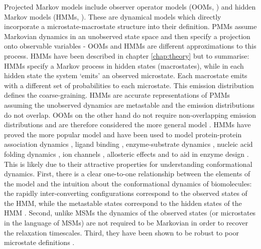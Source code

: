 Projected Markov models include observer operator models (OOMs, \cite{wuProjectedMetastableMarkov2015}) and hidden Markov models (HMMs, \cite{noeProjectedHiddenMarkov2013a}). These are dynamical models which directly incorporate a microstate-macrostate structure into their definition.  PMMs assume Markovian dynamics in an unobserved state space and then specify a projection onto observable variables - OOMs and HMMs are different approximations to this process.  HMMs have been described in chapter \ref{chap:theory} but to summarise: HMMs specify a Markov process in hidden states (macrostates), while in each hidden state the system `emits' an observed microstate.  Each macrostate emits with a different set of probabilities to each microstate. This emission distribution defines the coarse-graining.  HMMs are accurate representations of PMMs assuming the unobserved dynamics are metastable and the emission distributions do not overlap.  OOMs on the other hand do not require non-overlapping emission distributions and are therefore considered the more general model \cite{wuProjectedMetastableMarkov2015}. HMMs have proved the more popular model and have been used to model protein-protein association dynamics \cite{plattnerCompleteProteinProtein2017}, ligand binding \cite{mondalAtomicResolutionMechanism2018a, yangMappingPathwayDynamics2018, ahalawatMappingSubstrateRecognition2018, olaposiMembraneBoundTranscriptionFactor2019, hansonWhatMakesKinase2019}, enzyme-substrate dynamics \cite{panConformationalHeterogeneityMichaelis2016, wangDynamicalBehaviorVLactamases2019, curado-carballadaHiddenConformationsAspergillus2019}, nucleic acid folding dynamics \cite{FastFoldingPathwaysThrombinBinding2018, remingtonFluorescenceQuenching2aminopurinelabeled2019}, ion channels \cite{furiniIontriggeredSelectivityBacterial2018}, allosteric effects \cite{xiaoNaBindingModes2019} and to aid in enzyme design \cite{juarez-jimenezDynamicDesignManipulation2020}. This is likely due to their attractive properties for understanding conformational dynamics.  First, there is a clear one-to-one relationship between the elements of the model and the intuition about the conformational dynamics of biomolecules: the rapidly inter-converting configurations correspond to the observed states of the HMM, while the metastable states correspond to the hidden states of the HMM \cite{noeProjectedHiddenMarkov2013a}. Second, unlike MSMs the dynamics of the observed states (or microstates in the language of MSMs) are not required to be Markovian in order to recover the relaxation timescales. Third, they have been shown to be robust to poor microstate definitions \cite{noeProjectedHiddenMarkov2013a}. 


